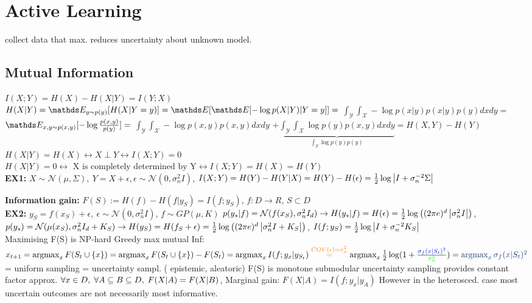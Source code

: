 \section{Active Learning}
collect data that max. reduces uncertainty about unknown model.
\subsection{Mutual Information}
$I(X;Y)=H(X)-H(X|Y)=I(Y;X)$\\
$H(X|Y) = \E[y \sim p(y)]{H(X|Y=y)} = \E{\E{-\log p(X|Y)|Y=y}} =$
$\int_{\mathcal{Y}}\int_{\mathcal{X}} -\log p(x|y) p(x|y) p(y) dx dy=$
$\E[x,y \sim p(x,y)]{-\log \frac{p(x,y)}{p(y)}} =$
$\int_{\mathcal{Y}}\int_{\mathcal{X}} - \log p(x,y) p(x,y) dx dy$
$+ \underbrace{\int_{\mathcal{Y}}\int_{\mathcal{X}} \log p(y) p(x,y) dx dy}_{\int_{\mathcal{Y}} \log p(y) p(y)}
= H(X,Y) - H(Y)$
$ H(X|Y) = H(X) \leftrightarrow X \perp Y \leftrightarrow I(X;Y) = 0$\\
$H(X|Y)=0 \leftrightarrow \text{ X is completely determined by Y} \leftrightarrow  I(X;Y) = H(X) = H(Y)$\\
\textbf{EX1:} $X \sim \mathcal{N}(\mu, \Sigma),\ Y=X+\epsilon,
\epsilon \sim \mathcal{N}(0, \sigma_{n}^{2}I)$,
$I(X;Y)=H(Y)-H(Y|X) = H(Y)-H(\epsilon) = \frac{1}{2} \log \left\lvert I+ \sigma_{n}^{-2}\Sigma\right\rvert$

\textbf{Information gain:}
$F(S) := H(f)-H(f|y_{S}) = I(f;y_{S})$, $f: D \rightarrow R$, $S \subset D$\\
\textbf{\color{orange} EX2:}\color{black} $y_{S} = f(x_{S}) + \epsilon,\ \epsilon \sim \mathcal{N}(0, \sigma_{n}^{2}I)$, $f \sim GP(\mu, K)$
$p(y_{s}|f) = \mathcal{N}(f(x_{S}), \sigma_{n}^{2} I_{d})
\rightarrow H(y_{s}|f) = H(\epsilon)= \frac{1}{2}\log \left((2\pi e)^{d} \left\lvert\sigma_{n}^{2}I\right\rvert\right)$,
$p(y_{s}) = \mathcal{N}(\mu(x_{S}), \sigma_{n}^{2} I_{d} + K_{S})
\rightarrow H(y_{S}) = H(f_{S} + \epsilon) =\frac{1}{2}\log \left((2\pi e)^{d} \left\lvert\sigma_{n}^{2}I + K_{S}\right\rvert\right)$,
$I(f;y_{S}) = \frac{1}{2} \log \left\lvert I+ \sigma_{n}^{-2} K_{S}\right\rvert$\\

Maximising F(S) is NP-hard \textrightarrow Greedy max mutual Inf:
$x_{t+1} = \argmax_{x}F(S_{t} \cup \{x\}) = \argmax_{x}F(S_{t} \cup \{x\}) -F(S_{t}) =
\argmax_{x}I(f; y_{x}|y_{S_{t}})
\overset{\color{orange} COV(\epsilon)=\sigma_{n}^{2}}{=}
\argmax_{x}\frac{1}{2} \log (1 + \frac{\color{blue}\sigma_{f}(x|S_{t})^{2}}{\color{green}{\sigma_{n}^{2}}})=
\color{myblue}\argmax_{x}\sigma_{f}(x|S_{t})^{2}$ = uniform sampling = uncertainty sampl. (\color{blue} epistemic,
\color{green} aleatoric) \color{black}
F(S) is monotone submodular \textrightarrow uncertainty sampling provides constant factor approx.
$\Forall {x \in D} \Forall {A \subseteq B \subseteq D} F(X|A) = F(X|B)$,
Marginal gain: $F(X|A)= I(f; y_{x} | y_{A})$
However in the heterosced. case most uncertain outcomes are not necessarily most informative.

